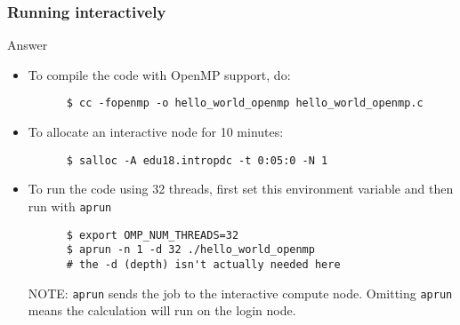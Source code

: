 \begin{frame}[fragile]
  \frametitle{Running interactively}
\begin{exampleblock}{{Answer}}
    \verbatimfont{\footnotesize}
    \begin{itemize}
    \item To compile the code with OpenMP support, do:
    \begin{verbatim}
      $ cc -fopenmp -o hello_world_openmp hello_world_openmp.c
    \end{verbatim}

    \item To allocate an interactive node for 10 minutes:
    \begin{verbatim}
      $ salloc -A edu18.intropdc -t 0:05:0 -N 1
    \end{verbatim}

    \item To run the code using 32 threads, first set this environment variable and then run with \verb|aprun|
    \begin{verbatim}
      $ export OMP_NUM_THREADS=32
      $ aprun -n 1 -d 32 ./hello_world_openmp  
      # the -d (depth) isn't actually needed here
    \end{verbatim}
    NOTE: \verb|aprun| sends the job to the interactive compute node. Omitting \verb|aprun| means the calculation will run 
    on the login node.

    \end{itemize}

\end{exampleblock}
\end{frame}







